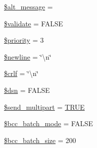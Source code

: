 \begin{DoxyCompactItemize}
\item 
\mbox{\hyperlink{class_c_i___email_a266e7a7eb7cbcb0fc73a94b22a310a14}{\$alt\+\_\+message}} = \textquotesingle{}\textquotesingle{}
\item 
\mbox{\hyperlink{class_c_i___email_a320b75b46e1832c327d9d47b4cea9e7d}{\$validate}} = F\+A\+L\+SE
\item 
\mbox{\hyperlink{class_c_i___email_a2677e505e860db863720ac4e216fd3f2}{\$priority}} = 3
\item 
\mbox{\hyperlink{class_c_i___email_a8735d5c31c4af1004825e6a28f236aeb}{\$newline}} = \char`\"{}\textbackslash{}n\char`\"{}
\item 
\mbox{\hyperlink{class_c_i___email_a85554ab78e9a915b4299dd3f1d5c2866}{\$crlf}} = \char`\"{}\textbackslash{}n\char`\"{}
\item 
\mbox{\hyperlink{class_c_i___email_a6441cca8c9fa11e16d2017e8cb733c10}{\$dsn}} = F\+A\+L\+SE
\item 
\mbox{\hyperlink{class_c_i___email_ad646213e73754a396d49eacaa7fc8218}{\$send\+\_\+multipart}} = \mbox{\hyperlink{constants_8php_ae04a3efe6aa42044f803ee90c2277846}{T\+R\+UE}}
\item 
\mbox{\hyperlink{class_c_i___email_ac67d3df67b03960980abe368f03e088e}{\$bcc\+\_\+batch\+\_\+mode}} = F\+A\+L\+SE
\item 
\mbox{\hyperlink{class_c_i___email_abdb56da29fb9feee14d2374170c3cb5c}{\$bcc\+\_\+batch\+\_\+size}} = 200
\end{DoxyCompactItemize}
